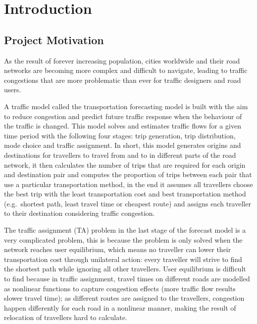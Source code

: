 \chapter{Introduction}



\section{Project Motivation}

As the result of forever increasing population,
cities worldwide and their road networks are becoming
more complex and difficult to navigate,
leading to traffic congestions that are more problematic than ever
for traffic designers and road users.

A traffic model called the transportation forecasting model is built
with the aim to reduce congestion and predict future traffic response when the behaviour of the traffic is changed.
This model solves and estimates traffic flows for a given time period with the following four stages: trip generation,
trip distribution, mode choice and traffic assignment.  
In short,
this model generates origins and destinations for travellers to travel from and to in different parts of the road network,
it then calculates the number of trips that are required for each origin and destination pair
and computes the proportion of trips between each pair that use a particular transportation method,
in the end it assumes all travellers choose the best trip with the least transportation cost and best transportation method (e.g.\ shortest path, least travel time or cheapest route) and
assigns each traveller to their destination considering traffic congestion.

The traffic assignment (TA) problem in the last stage of the forecast model is a very complicated problem, 
this is because the problem is only solved when the network reaches user equilibrium,
which means no traveller can lower their transportation cost through unilateral action: every traveller will strive to find the shortest path while ignoring all other travellers.
User equilibrium is difficult to find because in traffic assignment,
travel times on different roads are modelled as nonlinear functions to capture congestion effects (more traffic flow results slower travel time);
as different routes are assigned to the travellers,
congestion happen differently for each road in a nonlinear manner,
making the result of relocation of travellers hard to calculate.

